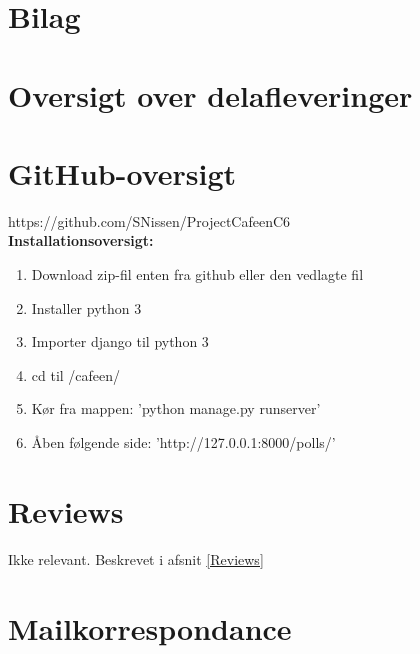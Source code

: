 \documentclass[]{article}
\begin{document}
\section*{Bilag}
\appendix
\section{Oversigt over delafleveringer}
%
\section{GitHub-oversigt}
https://github.com/SNissen/ProjectCafeenC6 \\
\textbf{Installationsoversigt:}
\begin{enumerate}
    \item Download zip-fil enten fra github eller den vedlagte fil
    \item Installer python 3
    \item Importer django til python 3
    \item cd til /cafeen/
    \item Kør fra mappen: 'python manage.py runserver'
    \item Åben følgende side: 'http://127.0.0.1:8000/polls/'
\end{enumerate}
    
\section{Reviews}
Ikke relevant. Beskrevet i afsnit \ref{Reviews}
%
\newpage
\section{Mailkorrespondance} \label{Mails}
%
%
%
\end{document}
